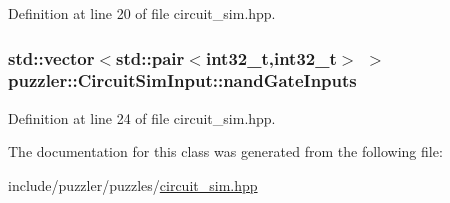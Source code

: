 Definition at line 20 of file circuit\+\_\+sim.\+hpp.

\hypertarget{a00003_a321be266e96bc3e9b37fedb6fbfda436}{}
\subsubsection[{nand\+Gate\+Inputs}]{\setlength{\rightskip}{0pt plus 5cm}std\+::vector$<$std\+::pair$<$int32\+\_\+t,int32\+\_\+t$>$ $>$ puzzler\+::\+Circuit\+Sim\+Input\+::nand\+Gate\+Inputs}\label{a00003_a321be266e96bc3e9b37fedb6fbfda436}


Definition at line 24 of file circuit\+\_\+sim.\+hpp.



The documentation for this class was generated from the following file\+:\begin{DoxyCompactItemize}
\item 
include/puzzler/puzzles/\hyperlink{a00129}{circuit\+\_\+sim.\+hpp}\end{DoxyCompactItemize}
